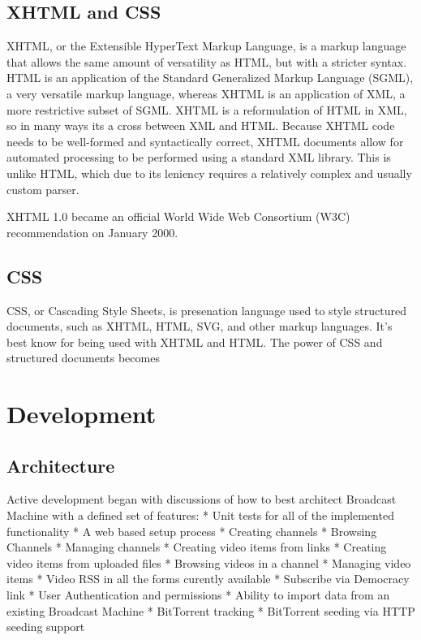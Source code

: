 \documentclass[a4paper,12pt]{report}
\begin{document}
\begin{description}
\section{XHTML and CSS}
XHTML, or the Extensible HyperText Markup Language, is a markup language that allows the same amount of versatility as HTML, but with a stricter syntax. 
HTML is an application of the Standard Generalized Markup Language (SGML), a very versatile markup language, whereas XHTML is an application of XML, a more restrictive subset of SGML. 
XHTML is a reformulation of HTML in XML, so in many ways its a cross between XML and HTML. 
Because XHTML code needs to be well-formed and syntactically correct, XHTML documents allow for automated processing to be performed using a standard XML library. 
This is unlike HTML, which due to its leniency requires a relatively complex and usually custom parser. 


XHTML 1.0 became an official World Wide Web Consortium (W3C) recommendation on January 2000. 


\section {CSS}
CSS, or Cascading Style Sheets, is presenation language used to style structured documents, such as XHTML, HTML, SVG, and other markup languages. 
It's best know for being used with XHTML and HTML. 
The power of CSS and structured documents becomes 


\chapter{Development}
\section{Architecture}
Active development began with discussions of how to best architect Broadcast Machine with a defined set of features:
  * Unit tests for all of the implemented functionality
  * A web based setup process
  * Creating channels
  * Browsing Channels
  * Managing channels
  * Creating video items from links
  * Creating video items from uploaded files
  * Browsing videos in a channel
  * Managing video items
  * Video RSS in all the forms curently available
  * Subscribe via Democracy link
  * User Authentication and permissions
  * Ability to import data from an existing Broadcast Machine
  * BitTorrent tracking
  * BitTorrent seeding via HTTP seeding support



\end{description}
\end{document}
